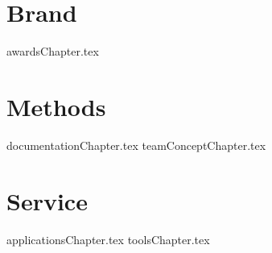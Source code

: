 \documentclass[letterpaper, 12pt]{memoir}  %
\begin{document}
\frontmatter %
\pagestyle{empty} %
\begin{titlingpage}
\titleM  %
\end{titlingpage}
\setmarginnotes{.1in}{.4in}{.1in}
\setulmarginsandblock{1in}{1in}{*}
\checkandfixthelayout
\makeatletter
\ch@ngetext
\makeatother
\tableofcontents %
\mainmatter %
\pagestyle{jalapenoPageStyleA} %
\part{Brand}
{awardsChapter.tex}
\part{Methods}
{documentationChapter.tex}
{teamConceptChapter.tex}
%
\part{Service}

{applicationsChapter.tex}
%
{toolsChapter.tex}

\end{document}
